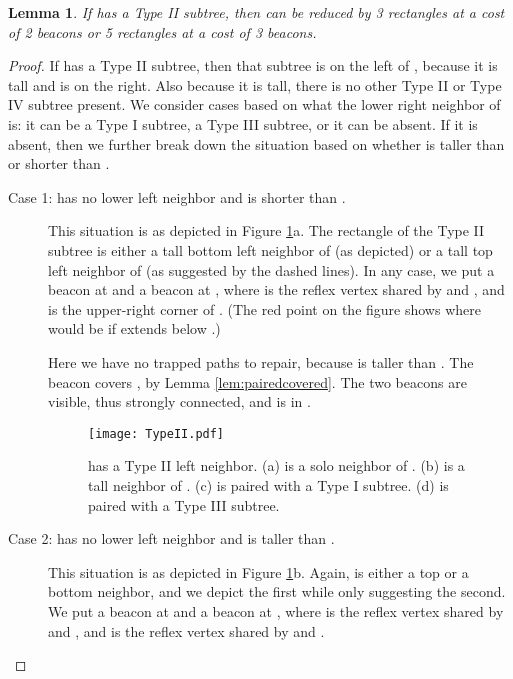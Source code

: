\documentclass{article}
\newtheorem{lemma}{Lemma}
\begin{document}
		\begin{lemma}\label{lem:typeII}
			If  has a Type II subtree, then  can be reduced by 3 
			rectangles at a cost of 2 beacons or 5 rectangles at
			a cost of 3 beacons.
		\end{lemma}
		\begin{proof}
			If  has a Type II subtree, then that subtree is on the left of ,
			because it is tall and  is on the right.  Also because it is tall, there
			is no other Type II or Type IV subtree present.  We consider cases based on 
			what the lower right neighbor of  is: it can be a Type I subtree, a Type
			III subtree, or it can be absent.  If it is absent, then we further break
			down the situation based on whether  is taller than or shorter than
			.
			
			\begin{description}
			\item[Case 1:  has no lower left neighbor and  is shorter
			than .] 
			
				This situation is as depicted in Figure \ref{fig:typetwo}a. 
				The rectangle  of the Type II subtree is either a tall bottom left
				neighbor of  (as depicted) or a tall top left neighbor of 
				(as suggested by the dashed lines).
				In any case, we put a beacon  at  and a
				beacon  at , where  is the reflex vertex
				shared by  and , and  is the upper-right corner of .
				(The red point  on the figure shows where  would be if 
				extends below .)
				
				Here we have no trapped paths to repair, because 
				is taller than . 
				The beacon  covers , by Lemma
				\ref{lem:pairedcovered}.
				The two beacons are visible, thus strongly connected, and  is in
				.
			
				\begin{figure}[htbp] 
					\begin{center}
						\texttt{[image: TypeII.pdf]} 
					\end{center}
					\caption{  has a Type II left neighbor.
						(a)  is a solo neighbor of .
						(b)  is a tall neighbor of .
						(c)  is paired with a Type I subtree.
						(d)  is paired with a Type III subtree.
					}
					\label{fig:typetwo}
				\end{figure}

			\item[Case 2:  has no lower left neighbor and  is taller than
			.] 
			
				This situation is as depicted in Figure \ref{fig:typetwo}b. 
				Again,  is either a top or a bottom neighbor, and we depict the first
				while only suggesting the second.
				We put a beacon  at  and a
				beacon  at , where  is the reflex
				vertex shared by  and , and  is the reflex
				vertex shared by  and .
				

\end{description}
\end{proof}
\end{document}
